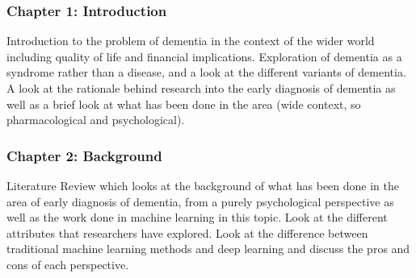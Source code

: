 \documentclass{article}
\begin{document}
\subsubsection{Chapter 1: Introduction}
Introduction to the problem of dementia in the context of the wider world including quality of life and financial implications. Exploration of dementia as a syndrome rather than a disease, and a look at the different variants of dementia. A look at the rationale behind research into the early diagnosis of dementia as well as a brief look at what has been done in the area (wide context, so pharmacological and psychological). \newline
\subsubsection{Chapter 2: Background}
Literature Review which looks at the background of what has been done in the area of early diagnosis of dementia, from a purely psychological perspective as well as the work done in machine learning in this topic. Look at the different attributes that researchers have explored. Look at the difference between traditional machine learning methods and deep learning and discuss the pros and cons of each perspective. \newline
\end{document}
